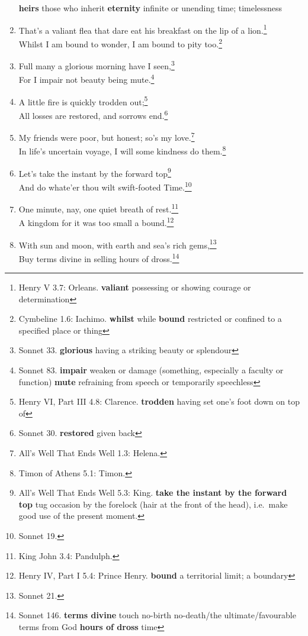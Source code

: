 \documentclass[17pt,twoside]{extarticle}
\begin{document}
\begin{enumerate}
{    \textbf{heirs} those who inherit \textbf{eternity} infinite or
    unending time; timelessness}
\item
  That's a valiant flea that dare eat his breakfast on the lip of a
  lion.\footnote{Henry V 3.7: Orleans. \textbf{valiant} possessing or
    showing courage or determination}\\Whilst I am bound to wonder, I am
  bound to pity too.\footnote{Cymbeline 1.6: Iachimo. \textbf{whilst}
    while \textbf{bound} restricted or confined to a specified place or
    thing}
\item
  Full many a glorious morning have I seen,\footnote{Sonnet 33.
    \textbf{glorious} having a striking beauty or splendour}\\For I
  impair not beauty being mute.\footnote{Sonnet 83. \textbf{impair}
    weaken or damage (something, especially a faculty or function)
    \textbf{mute} refraining from speech or temporarily speechless}
\item
  A little fire is quickly trodden out;\footnote{Henry VI, Part III 4.8:
    Clarence. \textbf{trodden} having set one's foot down on top of}\\All
  losses are restored, and sorrows end.\footnote{Sonnet 30.
    \textbf{restored} given back}
\item
  My friends were poor, but honest; so's my love.\footnote{All's Well
    That Ends Well 1.3: Helena.}\\In life's uncertain voyage, I will
  some kindness do them.\footnote{Timon of Athens 5.1: Timon.}
\item
  Let's take the instant by the forward top\footnote{All's Well That
    Ends Well 5.3: King. \textbf{take the instant by the forward top}
    tug occasion by the forelock (hair at the front of the head),
    i.e.~make good use of the present moment.}\\And do whate'er thou
  wilt swift-footed Time.\footnote{Sonnet 19.}
\item
  One minute, nay, one quiet breath of rest.\footnote{King John 3.4:
    Pandulph.}\\A kingdom for it was too small a bound.\footnote{Henry
    IV, Part I 5.4: Prince Henry. \textbf{bound} a territorial limit; a
    boundary}
\item
  With sun and moon, with earth and sea's rich gems,\footnote{Sonnet 21.}\\Buy
  terms divine in selling hours of dross.\footnote{Sonnet 146.
    \textbf{terms divine} touch no-birth no-death/the
    ultimate/favourable terms from God \textbf{hours of dross} time
}
\end{enumerate}
\end{document}
